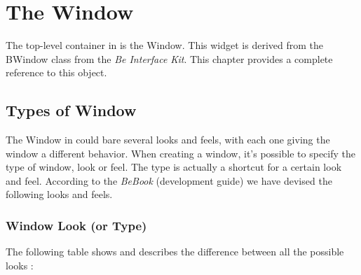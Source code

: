 \chapter{The Window}

The top-level container in \squirrel is the Window. This widget is derived from the BWindow class from the {\em Be Interface Kit}. This chapter provides a complete reference to this object.

\section{Types of Window}

The Window in \beos could bare several looks and feels, with each one giving the window a different behavior. When creating a window, it's possible to specify the type of window, look or feel. The type is actually a shortcut for a certain look and feel. According to the {\em BeBook} (\beos development guide) we have devised the following looks and feels.

\subsection{Window Look (or Type)}

The following table shows and describes the difference between all the possible looks :

